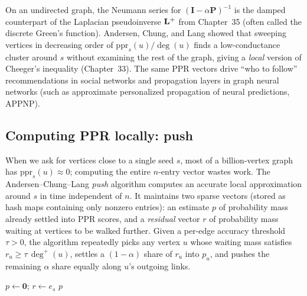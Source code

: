 \begin{connectionbox}
On an undirected graph, the Neumann series for $(\mathbf{I}-\alpha\mathbf{P})^{-1}$ is the damped counterpart of the Laplacian pseudoinverse $\mathbf{L}^+$ from Chapter~35 (often called the discrete Green's function). Andersen, Chung, and Lang showed that sweeping vertices in decreasing order of $\mathrm{ppr}_s(u)/\deg(u)$ finds a low-conductance cluster around $s$ without examining the rest of the graph, giving a \emph{local} version of Cheeger's inequality (Chapter~33). The same PPR vectors drive ``who to follow'' recommendations in social networks and propagation layers in graph neural networks (such as approximate personalized propagation of neural predictions, APPNP).
\end{connectionbox}

\subsection{Computing PPR locally: push}

When we ask for vertices close to a single seed $s$, most of a billion-vertex graph has $\mathrm{ppr}_s(u) \approx 0$; computing the entire $n$-entry vector wastes work. The Andersen--Chung--Lang \emph{push} algorithm computes an accurate local approximation around $s$ in time independent of $n$. It maintains two sparse vectors (stored as hash maps containing only nonzero entries): an estimate $p$ of probability mass already settled into PPR scores, and a \emph{residual} vector $r$ of probability mass waiting at vertices to be walked further. Given a per-edge accuracy threshold $\tau > 0$, the algorithm repeatedly picks any vertex $u$ whose waiting mass satisfies $r_u \ge \tau\,\deg^+(u)$, settles a $(1-\alpha)$ share of $r_u$ into $p_u$, and pushes the remaining $\alpha$ share equally along $u$'s outgoing links.

\begin{algorithm}[H]
\caption{Approximate Personalized PageRank by push (Andersen--Chung--Lang)}
\label{ch36:alg-push}
$p \gets \mathbf{0}$; \quad $r \gets e_s$\;
\Return $p$\;
\end{algorithm}


